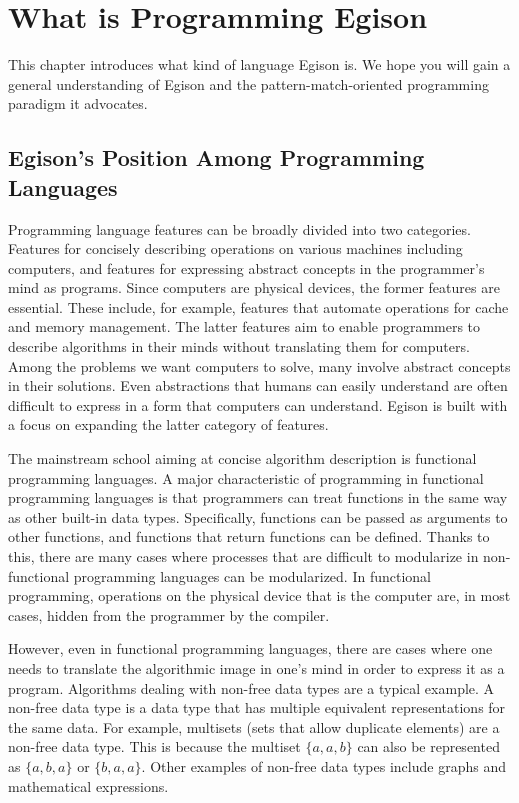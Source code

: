 \chapter{What is Programming Egison}\label{intro}

This chapter introduces what kind of language Egison is.
We hope you will gain a general understanding of Egison and the pattern-match-oriented programming paradigm it advocates.

\section{Egison's Position Among Programming Languages}\label{intro-egison}

Programming language features can be broadly divided into two categories.
Features for concisely describing operations on various machines including computers, and features for expressing abstract concepts in the programmer's mind as programs.
Since computers are physical devices, the former features are essential.
These include, for example, features that automate operations for cache and memory management.
The latter features aim to enable programmers to describe algorithms in their minds without translating them for computers.
Among the problems we want computers to solve, many involve abstract concepts in their solutions.
Even abstractions that humans can easily understand are often difficult to express in a form that computers can understand.
Egison is built with a focus on expanding the latter category of features.

The mainstream school aiming at concise algorithm description is functional programming languages.
A major characteristic of programming in functional programming languages is that programmers can treat functions in the same way as other built-in data types.
Specifically, functions can be passed as arguments to other functions, and functions that return functions can be defined.
Thanks to this, there are many cases where processes that are difficult to modularize in non-functional programming languages can be modularized.
In functional programming, operations on the physical device that is the computer are, in most cases, hidden from the programmer by the compiler.

However, even in functional programming languages, there are cases where one needs to translate the algorithmic image in one's mind in order to express it as a program.
Algorithms dealing with non-free data types are a typical example.
A non-free data type is a data type that has multiple equivalent representations for the same data.
For example, multisets (sets that allow duplicate elements) are a non-free data type.
This is because the multiset $\{a, a, b\}$ can also be represented as $\{a, b, a\}$ or $\{b, a ,a\}$.
Other examples of non-free data types include graphs and mathematical expressions.

